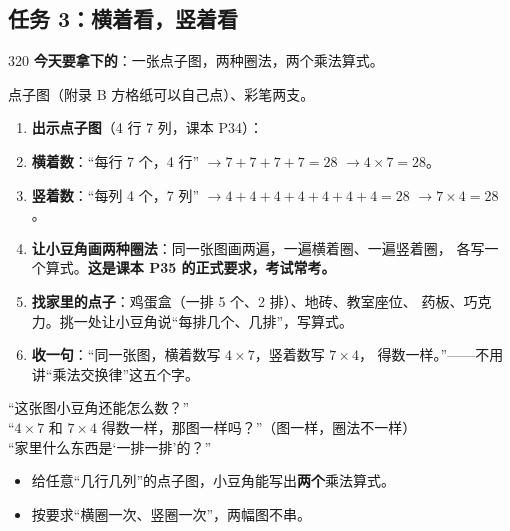 \subsection{任务 3：横着看，竖着看}

\begin{lesson}{3}{20}
\textbf{今天要拿下的}：一张点子图，两种圈法，两个乘法算式。

\begin{materials}
点子图（附录 B 方格纸可以自己点）、彩笔两支。
\end{materials}

\begin{enumerate}
  \item \textbf{出示点子图}（4 行 7 列，课本 P34）：
        \begin{center}
        \end{center}
  \item \textbf{横着数}：“每行 7 个，4 行” $\to 7+7+7+7=28$ $\to 4\times7=28$。
  \item \textbf{竖着数}：“每列 4 个，7 列” $\to 4+4+4+4+4+4+4=28$ $\to 7\times4=28$。
  \item \textbf{让小豆角画两种圈法}：同一张图画两遍，一遍横着圈、一遍竖着圈，
        各写一个算式。\textbf{这是课本 P35 的正式要求，考试常考。}
  \item \textbf{找家里的点子}：鸡蛋盒（一排 5 个、2 排）、地砖、教室座位、
        药板、巧克力。挑一处让小豆角说“每排几个、几排”，写算式。
  \item \textbf{收一句}：“同一张图，横着数写 $4\times7$，竖着数写 $7\times4$，
        得数一样。”——不用讲“乘法交换律”这五个字。
\end{enumerate}

\begin{saybox}
“这张图小豆角还能怎么数？”\\
“$4\times7$ 和 $7\times4$ 得数一样，那图一样吗？”（图一样，圈法不一样）\\
“家里什么东西是‘一排一排’的？”
\end{saybox}

\begin{passbox}
\begin{itemize}
  \item 给任意“几行几列”的点子图，小豆角能写出\textbf{两个}乘法算式。
  \item 按要求“横圈一次、竖圈一次”，两幅图不串。
\end{itemize}
\end{passbox}
\end{lesson}

